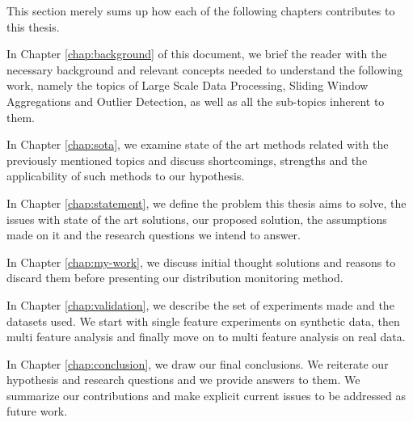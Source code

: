 This section merely sums up how each of the following chapters contributes to this thesis.

In Chapter \ref{chap:background} of this document, we brief the reader with the necessary background and relevant concepts needed to understand the following work, namely the topics of Large Scale Data Processing, Sliding Window Aggregations and Outlier Detection, as well as all the sub-topics inherent to them. 

In Chapter \ref{chap:sota}, we examine state of the art methods related with the previously mentioned topics and discuss shortcomings, strengths and the applicability of such methods to our hypothesis.

In Chapter \ref{chap:statement}, we define the problem this thesis aims to solve, the issues with state of the art solutions, our proposed solution, the assumptions made on it and the research questions we intend to answer.

In Chapter \ref{chap:my-work}, we discuss initial thought solutions and reasons to discard them before presenting our distribution monitoring method.

In Chapter \ref{chap:validation}, we describe the set of experiments made and the datasets used. We start with single feature experiments on synthetic data, then multi feature analysis and finally move on to multi feature analysis on real data.

In Chapter \ref{chap:conclusion}, we draw our final conclusions. We reiterate our hypothesis and research questions and we provide answers to them. We summarize our contributions and make explicit current issues to be addressed as future work.
